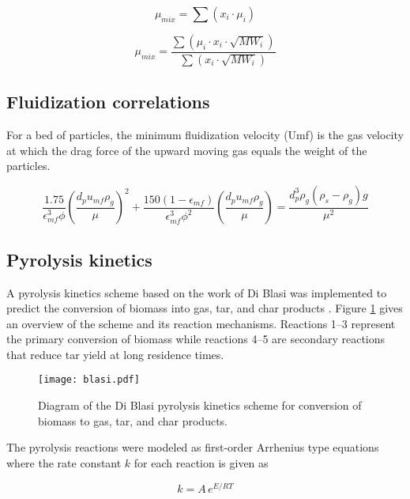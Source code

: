 \begin{equation}\label{eq:graham}
    \mu_{mix} = \sum(x_i \cdot \mu_i)
\end{equation}

\begin{equation}\label{eq:herning}
    \mu_{mix} = \frac{\sum(\mu_i \cdot x_i \cdot \sqrt{MW_i})}{\sum(x_i \cdot \sqrt{MW_i})}
\end{equation}

\subsection{Fluidization correlations}

For a bed of particles, the minimum fluidization velocity (Umf) is the gas velocity at which the drag force of the upward moving gas equals the weight of the particles.

\begin{equation}
    \frac{1.75}{\epsilon_{mf}^3 \phi} \left( \frac{d_p u_{mf} \rho_g}{\mu} \right)^2 + \frac{150(1-\epsilon_{mf})}{\epsilon_{mf}^3 \phi^2} \left( \frac{d_p u_{mf} \rho_g}{\mu} \right) = \frac{d_p^3 \rho_g (\rho_s - \rho_g) g}{\mu^2}
\end{equation}

\subsection{Pyrolysis kinetics}

A pyrolysis kinetics scheme based on the work of Di Blasi was implemented to predict the conversion of biomass into gas, tar, and char products \cite{Blasi-1993,Blasi-2001}. Figure \ref{fig:blasi} gives an overview of the scheme and its reaction mechanisms. Reactions 1--3 represent the primary conversion of biomass while reactions 4--5 are secondary reactions that reduce tar yield at long residence times.

\begin{figure}[H]
    \centering
    \texttt{[image: blasi.pdf]}
    \caption{Diagram of the Di Blasi pyrolysis kinetics scheme for conversion of biomass to gas, tar, and char products.}
    \label{fig:blasi}
\end{figure}

The pyrolysis reactions were modeled as first-order Arrhenius type equations where the rate constant $k$ for each reaction is given as

\begin{equation}
    k = A\,e^{E / RT}
\end{equation}


